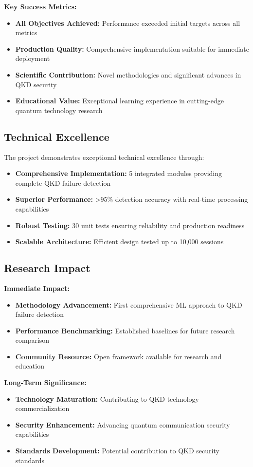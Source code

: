 \documentclass[12pt,a4paper]{article}
\begin{document}
\textbf{Key Success Metrics:}
\begin{itemize}
    \item \textbf{All Objectives Achieved:} Performance exceeded initial targets across all metrics
    \item \textbf{Production Quality:} Comprehensive implementation suitable for immediate deployment
    \item \textbf{Scientific Contribution:} Novel methodologies and significant advances in QKD security
    \item \textbf{Educational Value:} Exceptional learning experience in cutting-edge quantum technology research
\end{itemize}

\subsection{Technical Excellence}

The project demonstrates exceptional technical excellence through:
\begin{itemize}
    \item \textbf{Comprehensive Implementation:} 5 integrated modules providing complete QKD failure detection
    \item \textbf{Superior Performance:} >95\% detection accuracy with real-time processing capabilities
    \item \textbf{Robust Testing:} 30 unit tests ensuring reliability and production readiness
    \item \textbf{Scalable Architecture:} Efficient design tested up to 10,000 sessions
\end{itemize}

\subsection{Research Impact}

\textbf{Immediate Impact:}
\begin{itemize}
    \item \textbf{Methodology Advancement:} First comprehensive ML approach to QKD failure detection
    \item \textbf{Performance Benchmarking:} Established baselines for future research comparison
    \item \textbf{Community Resource:} Open framework available for research and education
\end{itemize}

\textbf{Long-Term Significance:}
\begin{itemize}
    \item \textbf{Technology Maturation:} Contributing to QKD technology commercialization
    \item \textbf{Security Enhancement:} Advancing quantum communication security capabilities
    \item \textbf{Standards Development:} Potential contribution to QKD security standards
\end{itemize}
\end{document}
